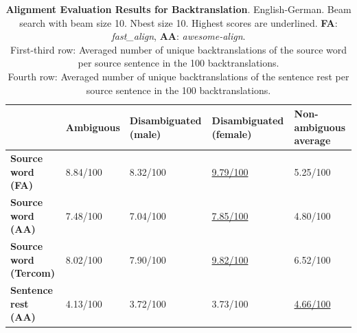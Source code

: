 \begin{table}[!htb]

    \begin{subtable}{\textwidth}
        \centering
        \begin{tabularx}{\linewidth}{|X|XXXX|}
            \hline
             & \textbf{Ambiguous} & \textbf{Disambiguated (male)} & \textbf{Disambiguated (female)} & \textbf{Non-ambiguous average} \\ \hline
             \textbf{Source word (FA)} & 8.84/100 & 8.32/100 & \underline{9.79/100} & 5.25/100 \\ 
             \textbf{Source word (AA)} & 7.48/100 & 7.04/100 & \underline{7.85/100} & 4.80/100 \\ 
             \textbf{Source word (Tercom)} & 8.02/100 & 7.90/100 & \underline{9.82/100} & 6.52/100 \\ \hline
             \textbf{Sentence rest (AA)} & 4.13/100 & 3.72/100 & 3.73/100 & \underline{4.66/100} \\ \hline
        \end{tabularx}
        \caption{\textbf{Alignment Evaluation Results for Backtranslation}. English-German. Beam search with beam size 10. Nbest size 10. Highest scores are underlined. \textbf{FA}: \textit{fast\_align}, \textbf{AA}: \textit{awesome-align}. \\ First-third row: Averaged number of unique backtranslations of the source word per source sentence in the 100 backtranslations. \\ Fourth row: Averaged number of unique backtranslations of the sentence rest per source sentence in the 100 backtranslations.}
        \label{tab:alignment_backtranslation_10}
    \end{subtable}


\end{table}
